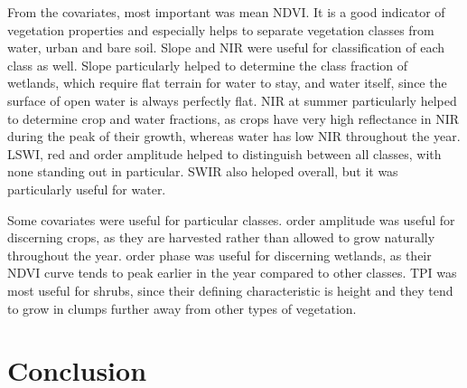 \documentclass[a4paper,10pt]{book}
\begin{document}
From the covariates, most important was mean NDVI. It is a good indicator of vegetation properties and especially helps to separate vegetation classes from water, urban and bare soil. Slope and NIR were useful for classification of each class as well. Slope particularly helped to determine the class fraction of wetlands, which require flat terrain for water to stay, and water itself, since the surface of open water is always perfectly flat. NIR at summer particularly helped to determine crop and water fractions, as crops have very high reflectance in NIR during the peak of their growth, whereas water has low NIR throughout the year. LSWI, red and  order amplitude helped to distinguish between all classes, with none standing out in particular. SWIR also heloped overall, but it was particularly useful for water.

Some covariates were useful for particular classes.  order amplitude was useful for discerning crops, as they are harvested rather than allowed to grow naturally throughout the year.  order phase was useful for discerning wetlands, as their NDVI curve tends to peak earlier in the year compared to other classes. TPI was most useful for shrubs, since their defining characteristic is height and they tend to grow in clumps further away from other types of vegetation.

\chapter{Conclusion}


\end{document}
